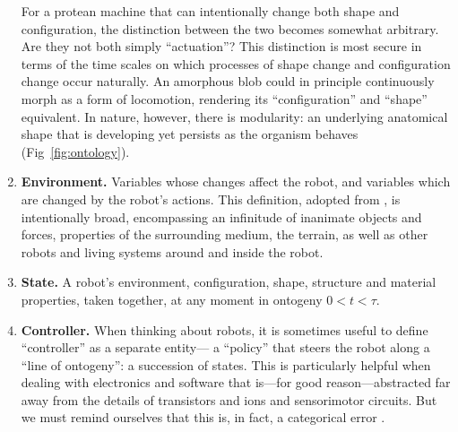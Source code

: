 \begin{enumerate}
    
    For a protean machine that can intentionally change both shape and configuration, the distinction between the two becomes somewhat arbitrary.
    Are they not both simply ``actuation''?
    This distinction is most secure in terms of the time scales on which processes of shape change 
    and configuration change 
    occur naturally.
    An amorphous blob could in principle continuously morph as a form of locomotion, rendering its ``configuration'' and ``shape'' equivalent.
    In nature, however, there is modularity: an underlying anatomical shape that is developing yet persists as the organism behaves (Fig~\ref{fig:ontology}).
    
    
    \item \textbf{Environment.}
    Variables whose changes affect the robot, 
    and variables which are changed by the robot's actions.
    This definition, adopted from \citet{ashby1952design}, is intentionally broad, encompassing an infinitude of inanimate objects and forces, 
    properties of the surrounding medium,
    the terrain,
    as well as other robots and living systems around and inside the robot.
    
    \item \textbf{State.}
    A robot's environment, configuration, shape, structure and material properties, taken together, at any moment in ontogeny $0<t<\tau$.
    
    
    \item \textbf{Controller.}
    When thinking about robots, it is sometimes useful to define ``controller'' as a separate entity---%
    a ``policy'' \cite{sutton2018reinforcement}
    that steers the robot along a ``line of ontogeny'': a succession of states.
    This is particularly helpful when dealing with electronics and software that is---for good reason---abstracted far away from the details of transistors and ions and sensorimotor circuits.
    But we must remind ourselves that this is, in fact, a categorical error \cite{dreyfus1967computers,harvey2000robotics,pfeifer2006body}.
    

\end{enumerate}
